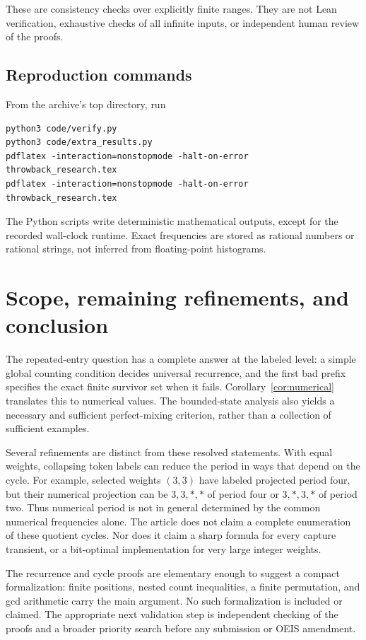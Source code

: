 \documentclass[11pt,letterpaper]{article}
\theoremstyle{definition}
\begin{document}
These are consistency checks over explicitly finite ranges. They are not
Lean verification, exhaustive checks of all infinite inputs, or independent
human review of the proofs.

\subsection{Reproduction commands}
From the archive's top directory, run
\begin{lstlisting}
python3 code/verify.py
python3 code/extra_results.py
pdflatex -interaction=nonstopmode -halt-on-error throwback_research.tex
pdflatex -interaction=nonstopmode -halt-on-error throwback_research.tex
\end{lstlisting}
The Python scripts write deterministic mathematical outputs, except for the
recorded wall-clock runtime. Exact frequencies are stored as rational numbers
or rational strings, not inferred from floating-point histograms.

\section{Scope, remaining refinements, and conclusion}\label{sec:scope}
The repeated-entry question has a complete answer at the labeled level:
a simple global counting condition decides universal recurrence, and the
first bad prefix specifies the exact finite survivor set when it fails.
Corollary~\ref{cor:numerical} translates this to numerical values. The
bounded-state analysis also yields a necessary and sufficient perfect-mixing
criterion, rather than a collection of sufficient examples.

Several refinements are distinct from these resolved statements. With equal
weights, collapsing token labels can reduce the period in ways that depend
on the cycle. For example, selected weights $(3,3)$ have labeled projected
period four, but their numerical projection can be $3,3,\ast,\ast$ of period
four or $3,\ast,3,\ast$ of period two. Thus numerical period is not in general
determined by the common numerical frequencies alone. The article does not
claim a complete enumeration of these quotient cycles. Nor does it claim a
sharp formula for every capture transient, or a bit-optimal implementation
for very large integer weights.

The recurrence and cycle proofs are elementary enough to suggest a compact
formalization: finite positions, nested count inequalities, a finite
permutation, and gcd arithmetic carry the main argument. No such
formalization is included or claimed. The appropriate next validation step
is independent checking of the proofs and a broader priority search before
any submission or OEIS amendment.
\end{document}
